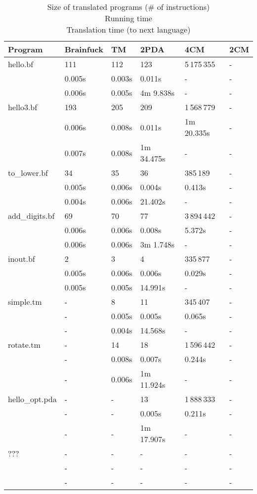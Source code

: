 \documentclass[english,shortabstract,mgr]{iithesis}
\begin{document}
\begin{table}[]
\centering
\caption{
Size of translated programs (\# of instructions)\\
Running time \\
Translation time (to next language)\\
}
\begin{center}
\label{t:my-label}
\begin{tabular}{llllll}
Program & Brainfuck & TM & 2PDA & 4CM & 2CM \\
\hline
hello.bf & 111 & 112 & 123 & 5\,175\,355 & -\\
 & 0.005s & 0.003s & 0.011s & - & - \\
 & 0.006s & 0.005s & 4m 9.838s & - & - \\
\hline
hello3.bf & 193 & 205 & 209 & 1\,568\,779 & -\\
 & 0.006s & 0.008s & 0.011s & 1m 20.335s & - \\
 & 0.007s & 0.008s & 1m 34.475s & - & - \\
\hline
to\_lower.bf & 34 & 35 & 36 & 385\,189 & -\\
 & 0.005s & 0.006s & 0.004s & 0.413s & - \\
 & 0.004s & 0.006s & 21.402s & - & - \\
\hline
add\_digits.bf & 69 & 70 & 77 & 3\,894\,442 & -\\
 & 0.006s & 0.006s & 0.008s & 5.372s & - \\
 & 0.006s & 0.006s & 3m 1.748s & - & - \\
\hline
inout.bf & 2 & 3 & 4 & 335\,877 & -\\
 & 0.005s & 0.006s & 0.006s & 0.029s & - \\
 & 0.005s & 0.005s & 14.991s & - & - \\
\hline
simple.tm & - & 8 & 11 & 345\,407 & -\\
 & - & 0.005s & 0.005s & 0.065s & - \\
 & - & 0.004s & 14.568s & - & - \\
\hline
rotate.tm & - & 14 & 18 & 1\,596\,442 & -\\
 & - & 0.008s & 0.007s & 0.244s & - \\
 & - & 0.006s & 1m 11.924s & - & - \\
\hline
hello\_opt.pda & - & - & 13 & 1\,888\,333 & -\\
 & - & - & 0.005s & 0.211s & - \\
 & - & - & 1m 17.907s & - & - \\
\hline
??? & - & - & - & - & -\\
 & - & - & - & - & - \\
 & - & - & - & - & - \\
\end{tabular}
\end{center}
\end{table}
\end{document}
